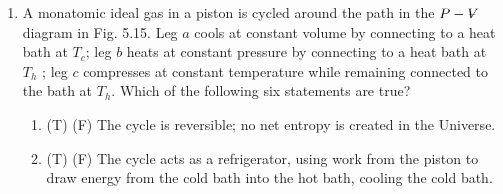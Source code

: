 \documentclass[10pt]{article}
\newenvironment{Solution}
    {\textbf{Solution:}
    
    \vspace{5mm}
    \begin{tcolorbox}
    }
    {
    \end{tcolorbox}
    \vspace{5mm}
    }
\newcommand{\vol}{{\ooalign{\hfil$V$\hfil\cr\kern0.08em--\hfil\cr}}}
\begin{document}
\begin{enumerate}
\begin{enumerate}
    \item \label{3.10b} Show, if $f$ is a function of $x$ and $y$ that 
    \begin{equation}
        \left.\frac{\partial x}{\partial y}\right|_f 
        \left.\frac{\partial y}{\partial f}\right|_x 
        \left.\frac{\partial f}{\partial x}\right|_y = -1
    \end{equation}
    (Hint:  Consider the triangular path in EOPC Fig. 3.4. The first side starts at $(x_0 , y_0 , f_0 )$ and moves along a contour at constant $f$ to $y_0+\Delta y$. The resulting vertex will thus be at $\left(x_0+\left. {\partial x/\partial y}\right|_f \Delta y, y_0+\Delta y, f_0\right)$. The second side runs at constant $x$ back to $y_0$, and the third side runs at constant y back to $(x_0 , y_0 , f_0 )$. The curve must close to make $f$ a single-valued function; the resulting equation should imply the triple-product relation.)
    
    \begin{Solution}
    
    
    \end{Solution}
    
    \item Starting from the ‘traditional’ definitions for $P$ and $\mu$, apply your formula from part \ref{3.10b} to $S$ at fixed $E$ to derive the two equations in part \ref{3.10a} again. (This last calculation is done in the reverse direction in EOPC Section 3.4.)
    
    \begin{Solution}
    
    
    \end{Solution}
\end{enumerate}

\item A monatomic ideal gas in a piston is cycled around the path in the $P -\vol$ diagram in Fig. 5.15. Leg $a$ cools at constant volume by connecting to a heat bath at $T_c$; leg $b$ heats at constant pressure by connecting to a heat bath at $T_h$ ; leg $c$ compresses at constant temperature while remaining connected to the bath at $T_h$.
Which of the following six statements are true?
\begin{enumerate}
    \item (T) (F) The cycle is reversible; no net entropy is created in the Universe.
    
    \item (T) (F) The cycle acts as a refrigerator, using work from the piston to draw energy from the cold bath into the hot bath, cooling the cold bath.
    

\end{enumerate}
\end{enumerate}
\end{document}
